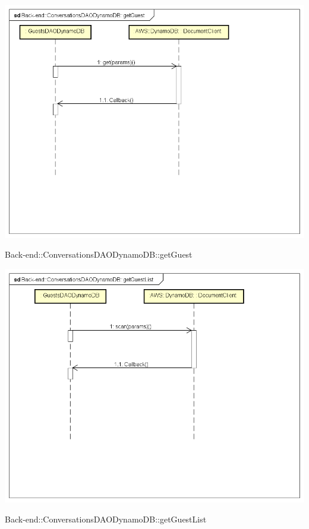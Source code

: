 \includegraphics[width=\textwidth,height=\textheight,keepaspectratio]{images/diagrams/back-end/Ufficial_Backend/Back-end__ConversationsDAODynamoDB__getGuest.png} 	\caption{Back-end::ConversationsDAODynamoDB::getGuest}
\includegraphics[width=\textwidth,height=\textheight,keepaspectratio]{images/diagrams/back-end/Ufficial_Backend/Back-end__ConversationsDAODynamoDB__getGuestList.png} 	\caption{Back-end::ConversationsDAODynamoDB::getGuestList}
